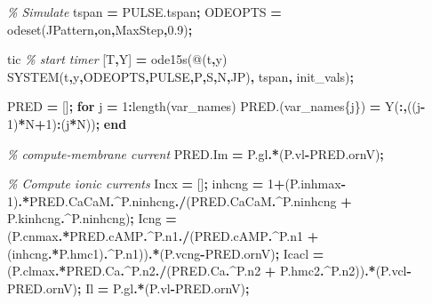 \documentclass[
]{article}
\newenvironment{Shaded}{\begin{snugshade}}{\end{snugshade}}
\newcommand{\CommentTok}[1]{\textcolor[rgb]{0.56,0.35,0.01}{\textit{#1}}}
\newcommand{\ControlFlowTok}[1]{\textcolor[rgb]{0.13,0.29,0.53}{\textbf{#1}}}
\newcommand{\FloatTok}[1]{\textcolor[rgb]{0.00,0.00,0.81}{#1}}
\newcommand{\FunctionTok}[1]{\textcolor[rgb]{0.00,0.00,0.00}{#1}}
\newcommand{\NormalTok}[1]{#1}
\newcommand{\OperatorTok}[1]{\textcolor[rgb]{0.81,0.36,0.00}{\textbf{#1}}}
\newcommand{\StringTok}[1]{\textcolor[rgb]{0.31,0.60,0.02}{#1}}
\begin{document}
\begin{Shaded}
\begin{Highlighting}[]
\CommentTok{\% Simulate}
\NormalTok{tspan }\OperatorTok{=}\NormalTok{ PULSE.tspan}\OperatorTok{\textquotesingle{};}
\NormalTok{ODEOPTS }\OperatorTok{=} \FunctionTok{odeset}\NormalTok{(}\StringTok{\textquotesingle{}JPattern\textquotesingle{}}\OperatorTok{,}\StringTok{\textquotesingle{}on\textquotesingle{}}\OperatorTok{,}\StringTok{\textquotesingle{}MaxStep\textquotesingle{}}\OperatorTok{,}\FloatTok{0.9}\NormalTok{)}\OperatorTok{;}

\FunctionTok{tic} \CommentTok{\% start timer}
\NormalTok{[T}\OperatorTok{,}\NormalTok{Y] }\OperatorTok{=}\NormalTok{ ode15s(@(t}\OperatorTok{,}\NormalTok{y) SYSTEM(t}\OperatorTok{,}\NormalTok{y}\OperatorTok{,}\NormalTok{ODEOPTS}\OperatorTok{,}\NormalTok{PULSE}\OperatorTok{,}\NormalTok{P}\OperatorTok{,}\NormalTok{S}\OperatorTok{,}\NormalTok{N}\OperatorTok{,}\NormalTok{JP)}\OperatorTok{,}\NormalTok{ tspan}\OperatorTok{,}\NormalTok{ init\_vals)}\OperatorTok{;}

\NormalTok{PRED }\OperatorTok{=}\NormalTok{ []}\OperatorTok{;}
\ControlFlowTok{for} \FunctionTok{j} \OperatorTok{=} \FloatTok{1}\OperatorTok{:}\FunctionTok{length}\NormalTok{(var\_names)}
\NormalTok{    PRED.(var\_names\{}\FunctionTok{j}\NormalTok{\}) }\OperatorTok{=}\NormalTok{ Y(}\OperatorTok{:,}\NormalTok{((}\FunctionTok{j}\OperatorTok{{-}}\FloatTok{1}\NormalTok{)}\OperatorTok{*}\NormalTok{N}\OperatorTok{+}\FloatTok{1}\NormalTok{)}\OperatorTok{:}\NormalTok{(}\FunctionTok{j}\OperatorTok{*}\NormalTok{N))}\OperatorTok{;}
\ControlFlowTok{end}

\CommentTok{\% compute{-}membrane current}
\NormalTok{PRED.Im }\OperatorTok{=}\NormalTok{ P.gl}\OperatorTok{.*}\NormalTok{(P.vl}\OperatorTok{{-}}\NormalTok{PRED.ornV)}\OperatorTok{;}

\CommentTok{\% Compute ionic currents}
\NormalTok{Incx }\OperatorTok{=}\NormalTok{ []}\OperatorTok{;}
\NormalTok{inhcng }\OperatorTok{=} \FloatTok{1}\OperatorTok{+}\NormalTok{(P.inhmax}\OperatorTok{{-}}\FloatTok{1}\NormalTok{)}\OperatorTok{.*}\NormalTok{PRED.CaCaM}\OperatorTok{.\^{}}\NormalTok{P.ninhcng}\OperatorTok{./}\NormalTok{(PRED.CaCaM}\OperatorTok{.\^{}}\NormalTok{P.ninhcng }\OperatorTok{+}\NormalTok{ P.kinhcng}\OperatorTok{.\^{}}\NormalTok{P.ninhcng)}\OperatorTok{;}
\NormalTok{Icng }\OperatorTok{=}\NormalTok{ (P.cnmax}\OperatorTok{.*}\NormalTok{PRED.cAMP}\OperatorTok{.\^{}}\NormalTok{P.n1}\OperatorTok{./}\NormalTok{(PRED.cAMP}\OperatorTok{.\^{}}\NormalTok{P.n1 }\OperatorTok{+}\NormalTok{ (inhcng}\OperatorTok{.*}\NormalTok{P.hmc1)}\OperatorTok{.\^{}}\NormalTok{P.n1))}\OperatorTok{.*}\NormalTok{(P.vcng}\OperatorTok{{-}}\NormalTok{PRED.ornV)}\OperatorTok{;}
\NormalTok{Icacl }\OperatorTok{=}\NormalTok{ (P.clmax}\OperatorTok{.*}\NormalTok{PRED.Ca}\OperatorTok{.\^{}}\NormalTok{P.n2}\OperatorTok{./}\NormalTok{(PRED.Ca}\OperatorTok{.\^{}}\NormalTok{P.n2 }\OperatorTok{+}\NormalTok{ P.hmc2}\OperatorTok{.\^{}}\NormalTok{P.n2))}\OperatorTok{.*}\NormalTok{(P.vcl}\OperatorTok{{-}}\NormalTok{PRED.ornV)}\OperatorTok{;}
\NormalTok{Il }\OperatorTok{=}\NormalTok{ P.gl}\OperatorTok{.*}\NormalTok{(P.vl}\OperatorTok{{-}}\NormalTok{PRED.ornV)}\OperatorTok{;}        


\end{Highlighting}
\end{Shaded}
\end{document}
